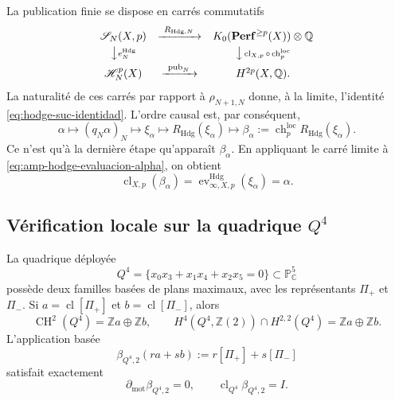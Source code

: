 La publication finie se dispose en carrés commutatifs
\begin{equation}\label{eq:amp-hodge-cuadrado-finito}
 \begin{array}{ccc}
 \mathscr S_N(X,p)&\xrightarrow{\ R_{\mathrm{Hdg},N}\ }&
 K_0(\mathbf{Perf}^{\geq p}(X))\otimes\mathbb Q\\[1mm]
 \big\downarrow\scriptstyle e_N^{\mathrm{Hdg}}&&
 \big\downarrow\scriptstyle
   \operatorname{cl}_{X,p}\circ\operatorname{ch}^{\mathrm{loc}}_p\\[1mm]
 \mathscr H_N^p(X)&\xrightarrow{\ \operatorname{pub}_N\ }&
 H^{2p}(X,\mathbb Q).
 \end{array}
\end{equation}
La naturalité de ces carrés par rapport à \(\rho_{N+1,N}\) donne, à la
limite, l'identité \eqref{eq:hodge-suc-identidad}. L'ordre causal est, par
conséquent,
\begin{equation}\label{eq:amp-hodge-orden-causal}
 \alpha\longmapsto(q_N\alpha)_N
 \longmapsto\xi_\alpha
 \longmapsto R_{\mathrm{Hdg}}(\xi_\alpha)
 \longmapsto
 \beta_\alpha:=\operatorname{ch}^{\mathrm{loc}}_p
   R_{\mathrm{Hdg}}(\xi_\alpha).
\end{equation}
Ce n'est qu'à la dernière étape qu'apparaît \(\beta_\alpha\). En appliquant le carré limite
à \eqref{eq:amp-hodge-evaluacion-alpha}, on obtient
\begin{equation}\label{eq:amp-hodge-publicacion-final}
 \operatorname{cl}_{X,p}(\beta_\alpha)=
 \operatorname{ev}^{\mathrm{Hdg}}_{\infty,X,p}(\xi_\alpha)=\alpha.
\end{equation}

\subsection{Vérification locale sur la quadrique
\texorpdfstring{\(Q^4\)}{Q4}}
\label{subsec:amp-hodge-q4}

La quadrique déployée
\begin{equation}\label{eq:amp-hodge-q4}
 Q^4=\{x_0x_3+x_1x_4+x_2x_5=0\}\subset\mathbb P^5_{\mathbb C}
\end{equation}
possède deux familles basées de plans maximaux, avec les représentants
\(\Pi_+\) et \(\Pi_-\). Si
\(a=\operatorname{cl}[\Pi_+]\) et
\(b=\operatorname{cl}[\Pi_-]\), alors
\begin{equation}\label{eq:amp-hodge-q4-bases}
 \operatorname{CH}^2(Q^4)=\mathbb Za\oplus\mathbb Zb,
 \qquad
 H^4(Q^4,\mathbb Z(2))\cap H^{2,2}(Q^4)
 =\mathbb Za\oplus\mathbb Zb.
\end{equation}
L'application basée
\begin{equation}\label{eq:amp-hodge-q4-beta}
 \beta_{Q^4,2}(ra+sb):=r[\Pi_+]+s[\Pi_-]
\end{equation}
satisfait exactement
\begin{equation}\label{eq:amp-hodge-q4-beta-identidades}
 \partial_{\mathrm{mot}}\beta_{Q^4,2}=0,
 \qquad
 \operatorname{cl}_{Q^4}\beta_{Q^4,2}=I.
\end{equation}

